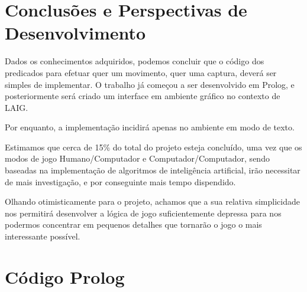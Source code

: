 \documentclass[15pt,a4paper]{article}
\begin{document}
\newpage

\section{Conclusões e Perspectivas de Desenvolvimento}


Dados os conhecimentos adquiridos, podemos concluir que o código dos predicados para efetuar quer um movimento, quer uma captura, deverá ser simples de implementar. 
O trabalho já começou a ser desenvolvido em Prolog, e posteriormente será criado um interface em ambiente gráfico no contexto de LAIG.

Por enquanto, a implementação incidirá apenas no ambiente em modo de texto.

Estimamos que cerca de 15\% do total do projeto esteja concluído, uma vez que os modos de jogo Humano/Computador e Computador/Computador, sendo baseadas na implementação de algoritmos de inteligência artificial, irão necessitar de mais investigação, e por conseguinte mais tempo dispendido.

Olhando otimisticamente para o projeto, achamos que a sua relativa simplicidade nos permitirá desenvolver a lógica de jogo suficientemente depressa para nos podermos concentrar em pequenos detalhes que tornarão o jogo o mais interessante possível.



\clearpage

\renewcommand\refname{Bibliografia}



\nocite{breakSite}
\nocite{tut1}
\nocite{tut2}


\newpage

\appendix
\section{Código Prolog}
\end{document}
